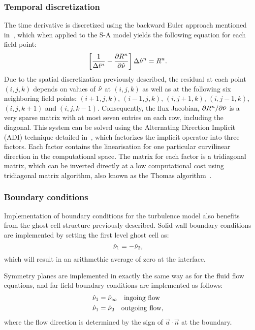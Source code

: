 \subsubsection{Temporal discretization}
%
The time derivative is discretized using the backward Euler approach mentioned in~, which when applied to the S-A model yields the following equation for each field point:
\begin{equation*}
    \left[
        \frac{1}{\Delta t^n} - \pdiff{R^n}{\sa}
    \right] \Delta \sa^n = R^n.
\end{equation*}
Due to the spatial discretization previously described, the residual at each point $(i,j,k)$ depends on values of $\sa$ at $(i,j,k)$ as well as at the following six neighboring field points: $(i+1,j,k)$, $(i-1,j,k)$, $(i,j+1,k)$, $(i,j-1,k)$, $(i,j,k+1)$ and $(i,j,k-1)$. Consequently, the flux Jacobian, $\partial R^n/\partial \sa$ is a very sparse matrix with at most seven entries on each row, including the diagonal. This system can be solved using the Alternating Direction Implicit (ADI) technique detailed in~\cite{blazek2015computational}, which factorizes the implicit operator into three factors. Each factor contains the linearisation for one particular curvilinear direction in the computational space. The matrix for each factor is a tridiagonal matrix, which can be inverted directly at a low computational cost using tridiagonal matrix algorithm, also known as the Thomas algorithm~\cite{thomas1949elliptic}.
%
\subsubsection{Boundary conditions}
%
Implementation of boundary conditions for the turbulence model also benefits from the ghost cell structure previously described. Solid wall boundary conditions are implemented by setting the first level ghost cell as:
\begin{equation*}
    \sa_1 = -\sa_2,
\end{equation*}
which will result in an arithmethic average of zero at the interface.

Symmetry planes are implemented in exactly the same way as for the fluid flow equations, and far-field boundary conditions are implemented as follows:
\begin{align*}
    \sa_1 &= \sa_\infty \quad\text{ingoing flow}\\
    \sa_1 &= \sa_2 \quad \text{outgoing flow},
\end{align*}
where the flow direction is determined by the sign of $\vec{u}\cdot\vec{n}$ at the boundary.

